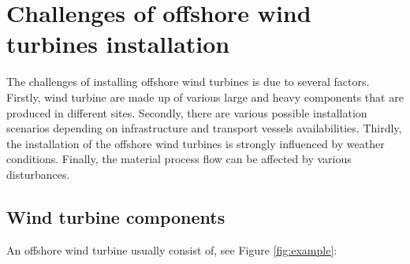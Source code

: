 \section{Challenges of offshore wind turbines installation}
The challenges of installing offshore wind turbines is due to several factors. Firstly, wind turbine are made up of various large and heavy components that are produced in different sites. Secondly, there are various possible installation scenarios depending on infrastructure and transport vessels availabilities. Thirdly, the installation of the offshore wind turbines is strongly influenced by weather conditions.  
Finally, the material process flow can be affected by various disturbances.

\subsection{Wind turbine components}
An offshore wind turbine usually consist of, see Figure \ref{fig:example}:

